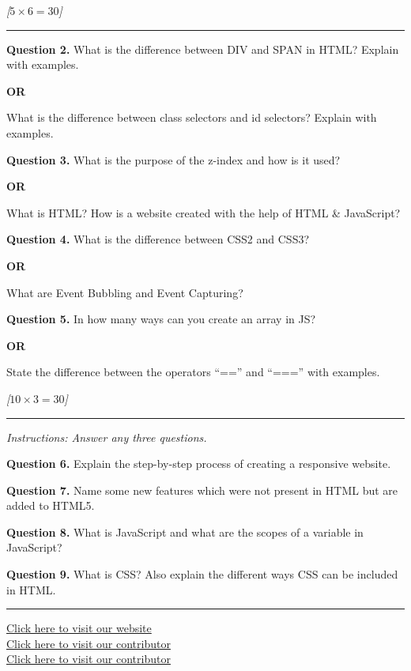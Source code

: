 \documentclass[11pt,a4paper]{article}
\newcommand{\pts}[1]{\hfill\textit{[#1]}}
\begin{document}
\bigskip{}\pts{$5 \times 6 = 30$}
\rule{\linewidth}{0.4pt}\smallskip

\medskip\noindent\textbf{Question 2.} What is the difference between DIV and SPAN in HTML? Explain with examples.
\centerline{\textbf{OR}}
What is the difference between class selectors and id selectors? Explain with examples.

\medskip\noindent\textbf{Question 3.} What is the purpose of the z-index and how is it used?
\centerline{\textbf{OR}}
What is HTML? How is a website created with the help of HTML \& JavaScript?

\medskip\noindent\textbf{Question 4.} What is the difference between CSS2 and CSS3?
\centerline{\textbf{OR}}
What are Event Bubbling and Event Capturing?

\medskip\noindent\textbf{Question 5.} In how many ways can you create an array in JS?
\centerline{\textbf{OR}}
State the difference between the operators ``=='' and ``==='' with examples.

\bigskip{}\pts{$10 \times 3 = 30$}
\rule{\linewidth}{0.4pt}\smallskip

\noindent\textit{Instructions: Answer any three questions.}

\medskip\noindent\textbf{Question 6.} Explain the step-by-step process of creating a responsive website.

\medskip\noindent\textbf{Question 7.} Name some new features which were not present in HTML but are added to HTML5.

\medskip\noindent\textbf{Question 8.} What is JavaScript and what are the scopes of a variable in JavaScript?

\medskip\noindent\textbf{Question 9.} What is CSS? Also explain the different ways CSS can be included in HTML.

\vfill
\rule{\linewidth}{0.4pt}
\begin{center}\small
\href{https://bhu-exam.vercel.app/}{Click here to visit our website}\\[4pt]\href{https://me-aryan.vercel.app/}{Click here to visit our contributor}\\[4pt]\href{https://quashan-me.vercel.app/}{Click here to visit our contributor}
\end{center}
\end{document}
